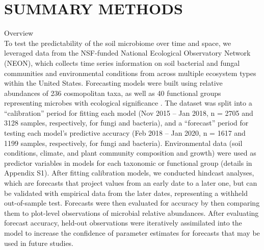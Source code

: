\documentclass[11pt]{article}
\begin{document}
\section{SUMMARY METHODS}

Overview \\
To test the predictability of the soil microbiome over time and space, we leveraged data from the NSF-funded National Ecological Observatory Network (NEON), which collects time series information on soil bacterial and fungal communities and environmental conditions from across multiple ecosystem types within the United States. Forecasting models were built using relative abundances of 236 cosmopolitan taxa, as well as 40 functional groups representing microbes with ecological significance \cite{averill_soil_2021}. The dataset was split into a “calibration” period for fitting each model (Nov 2015 – Jan 2018, n = 2705 and 3128 samples, respectively, for fungi and bacteria), and a “forecast” period for testing each model’s predictive accuracy (Feb 2018 – Jan 2020, n = 1617 and 1199 samples, respectively, for fungi and bacteria). Environmental data (soil conditions, climate, and plant community composition and growth) were used as predictor variables in models for each taxonomic or functional group (details in Appendix S1). After fitting calibration models, we conducted hindcast analyses, which are forecasts that project values from an early date to a later one, but can be validated with empirical data from the later dates, representing a withheld out-of-sample test. Forecasts were then evaluated for accuracy by then comparing them to plot-level observations of microbial relative abundances. After evaluating forecast accuracy, held-out observations were iteratively assimilated into the model to increase the confidence of parameter estimates for forecasts that may be used in future studies.
\end{document}
